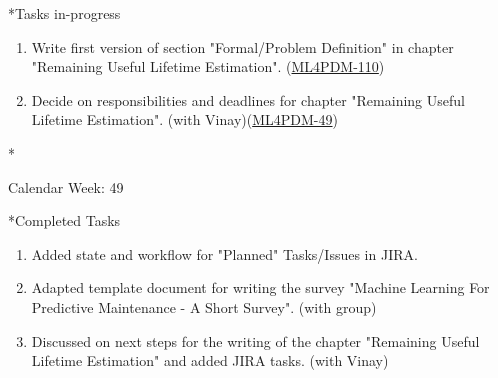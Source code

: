 \documentclass[11pt,a4paper]{article}
\begin{document}
\begin{section}
\begin{refsection}
   \newpage
   \begin{subsection}*{Tasks in-progress}
     \begin{enumerate}
       \item
             Write first version of section "Formal/Problem Definition" in chapter "Remaining Useful Lifetime Estimation". (\href{https://ml4pdm.atlassian.net/browse/ML4PDM-110}{ML4PDM-110})
       \item
             Decide on responsibilities and deadlines for chapter "Remaining Useful Lifetime Estimation". (with Vinay)(\href{https://ml4pdm.atlassian.net/browse/ML4PDM-49}{ML4PDM-49})
     \end{enumerate}
   \end{subsection}

   \printbibliography
 \end{refsection}
\end{section}

\newpage
\begin{section}*{Calendar Week: 49 \hfill \date{4 December, 2020}}
 \begin{refsection}

   \begin{subsection}*{Completed Tasks}
     \begin{enumerate}
       \item
             Added state and workflow for "Planned" Tasks/Issues in JIRA.
       \item
             Adapted template document for writing the survey "Machine Learning For Predictive Maintenance - A Short Survey".  (with group)
       \item
             Discussed on next steps for the writing of the chapter "Remaining Useful Lifetime Estimation" and added JIRA tasks. (with Vinay)
     \end{enumerate}
   \end{subsection}

 \end{refsection}
\end{section}
\end{document}
